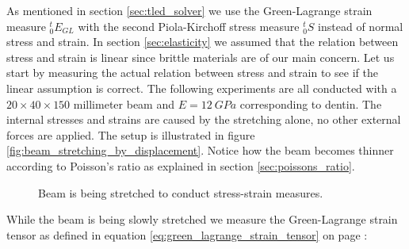 As mentioned in section \vref{sec:tled_solver} we use the
Green-Lagrange strain measure $^t_0E_{GL}$ 
with the second Piola-Kirchoff stress measure $^t_0S$ instead of
normal stress and strain. In section \vref{sec:elasticity} we assumed
that the relation between stress and strain is linear since brittle
materials are of our main concern. 
Let us start by measuring the actual
relation between stress and strain to see if the linear assumption is
correct. The following experiments are all conducted with a $20 \times
40 \times 150$ millimeter beam and $E = 12 \ GPa$ corresponding to
dentin. The internal stresses and strains are caused by 
the stretching alone, no other external forces are applied.
The setup is illustrated in figure
\vref{fig:beam_stretching_by_displacement}. Notice how the beam becomes
thinner according to Poisson's ratio as explained in section
\vref{sec:poissons_ratio}.

\begin{figure}
  \begin{minipage}[b]{0.5\linewidth}
    \centering
  \end{minipage}
  \begin{minipage}[b]{0.5\linewidth}
    \centering
  \end{minipage}
\caption{Beam is being stretched to conduct stress-strain measures.}
\label{fig:beam_stretching_by_displacement}
\end{figure}
  
While the beam is being slowly stretched we measure the Green-Lagrange
strain tensor as defined in equation
\eqref{eq:green_lagrange_strain_tensor} on page 
\pageref{eq:green_lagrange_strain_tensor}:

